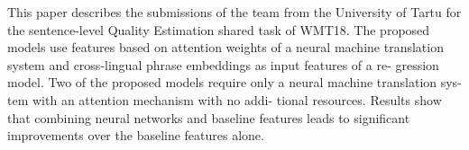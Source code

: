 This paper describes the submissions of the team from the University of Tartu for the sentence-level Quality Estimation shared task of WMT18. The proposed models use features based on attention weights of a neural machine translation system and cross-lingual phrase embeddings as input features of a re- gression model. Two of the proposed models require only a neural machine translation sys- tem with an attention mechanism with no addi- tional resources. Results show that combining neural networks and baseline features leads to significant improvements over the baseline features alone.
